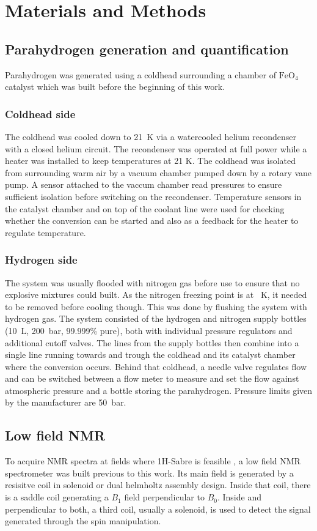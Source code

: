 \chapter{Materials and Methods}\label{chap:MaterialsAndMethods}
    \section{Parahydrogen generation and quantification}
    Parahydrogen was generated using a coldhead surrounding a chamber of $\mathrm{FeO_4}$ catalyst which was built before the beginning of this work. 
        \subsection{Coldhead side}
            The coldhead was cooled down to \SI{21}{\kelvin} via a watercooled helium recondenser with a closed helium circuit. The recondenser was operated at full power while a heater was installed to keep temperatures at 21 K. The coldhead was isolated from surrounding warm air by a vacuum chamber pumped down by a rotary vane pump. A sensor attached to the vaccum chamber read pressures to ensure sufficient isolation before switching on the recondenser. Temperature sensors in the catalyst chamber and on top of the coolant line were used for checking whether the conversion can be started and also as a feedback for the heater to regulate temperature.
        \subsection{Hydrogen side}
        The system was usually flooded with nitrogen gas before use to ensure that no explosive mixtures could built. As the nitrogen freezing point is at \SI{}{\kelvin}, it needed to be removed before cooling though. This was done by flushing the system with hydrogen gas. The system consisted of the hydrogen and nitrogen supply bottles (\SI{10}{\liter}, \SI{200}{\bar}, 99.999\% pure), both with individual pressure regulators and additional cutoff valves. The lines from the supply bottles then combine into a single line running towards and trough the coldhead and its catalyst chamber where the conversion occurs. Behind that coldhead, a needle valve regulates flow and can be switched between a flow meter to measure and set the flow against atmospheric pressure and a bottle storing the parahydrogen. Pressure limits given by the manufacturer are \SI{50}{\bar}. 
    \section{Low field NMR}
        To acquire NMR spectra at fields where 1H-Sabre is feasible , a low field NMR
        spectrometer was built  previous to this work. Its main field is generated by a resisitve
        coil in solenoid or dual helmholtz assembly design. Inside that coil, there is a saddle coil
        generating a $B_1$ field perpendicular to $B_0$. Inside and perpendicular to both, a third
        coil, usually a solenoid, is used to detect the signal generated through the spin manipulation.
